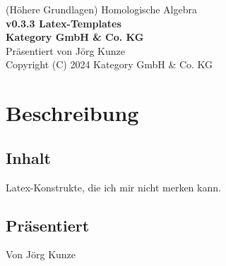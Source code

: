 \documentclass[a4paper]{amsart}
\theoremstyle{definition}
\begin{document}
\begin{titlepage}
\centering
{\huge
(Höhere Grundlagen) Homologische Algebra\\[1cm]
\textbf{v0.3.3 Latex-Templates}
}\\[1cm]

\textbf{Kategory GmbH \& Co. KG}\\
Präsentiert von Jörg Kunze\\
Copyright (C) 2024 Kategory GmbH \& Co. KG

\end{titlepage}

%

\newpage

\section*{Beschreibung}

\subsection*{Inhalt}
Latex-Konstrukte, die ich mir nicht merken kann.

\subsection*{Präsentiert}
Von Jörg Kunze
\end{document}

